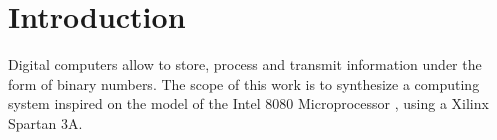 \section{Introduction} \label{sec:intro}
Digital computers allow to store, process and transmit information under the form of binary numbers.
The scope of this work is to synthesize a computing system inspired on the model of the Intel 8080 Microprocessor \cite{Assembly}, using a Xilinx Spartan 3A.